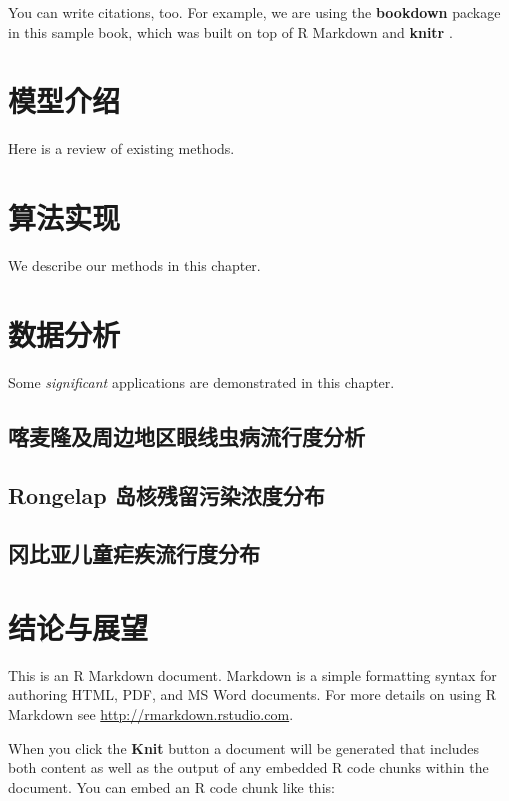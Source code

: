 \documentclass[a4paper,11pt,]{ctexbook}
\theoremstyle{definition}
\theoremstyle{definition}
\theoremstyle{definition}
\theoremstyle{remark}
\begin{document}
You can write citations, too. For example, we are using the
\textbf{bookdown} package \citep{R-bookdown} in this sample book, which
was built on top of R Markdown and \textbf{knitr} \citep{xie2015}.

\chapter{模型介绍}

Here is a review of existing methods.

\chapter{算法实现}\label{methods}

We describe our methods in this chapter.

\chapter{数据分析}

Some \emph{significant} applications are demonstrated in this chapter.

\section{喀麦隆及周边地区眼线虫病流行度分析}

\section{Rongelap 岛核残留污染浓度分布}\label{rongelap-}

\section{冈比亚儿童疟疾流行度分布}

\chapter{结论与展望}\label{summary}

This is an R Markdown document. Markdown is a simple formatting syntax
for authoring HTML, PDF, and MS Word documents. For more details on
using R Markdown see \url{http://rmarkdown.rstudio.com}.

When you click the \textbf{Knit} button a document will be generated
that includes both content as well as the output of any embedded R code
chunks within the document. You can embed an R code chunk like this:
\end{document}
